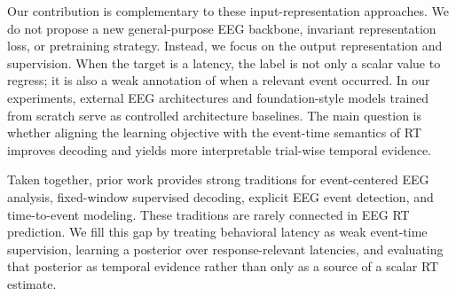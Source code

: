 Our contribution is complementary to these input-representation approaches. We do not propose a new general-purpose EEG backbone, invariant representation loss, or pretraining strategy. Instead, we focus on the output representation and supervision. When the target is a latency, the label is not only a scalar value to regress; it is also a weak annotation of when a relevant event occurred. In our experiments, external EEG architectures and foundation-style models trained from scratch serve as controlled architecture baselines. The main question is whether aligning the learning objective with the event-time semantics of RT improves decoding and yields more interpretable trial-wise temporal evidence.

Taken together, prior work provides strong traditions for event-centered EEG analysis, fixed-window supervised decoding, explicit EEG event detection, and time-to-event modeling. These traditions are rarely connected in EEG RT prediction. We fill this gap by treating behavioral latency as weak event-time supervision, learning a posterior over response-relevant latencies, and evaluating that posterior as temporal evidence rather than only as a source of a scalar RT estimate.
